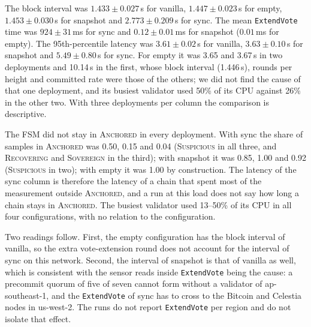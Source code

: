 The block interval was $1.433 \pm 0.027$\,s for vanilla, $1.447 \pm 0.023$\,s for empty, $1.453 \pm 0.030$\,s for snapshot and $2.773 \pm 0.209$\,s for sync. The mean \texttt{ExtendVote} time was $924 \pm 31$\,ms for sync and $0.12 \pm 0.01$\,ms for snapshot ($0.01$\,ms for empty). The 95th-percentile latency was $3.61 \pm 0.02$\,s for vanilla, $3.63 \pm 0.10$\,s for snapshot and $5.49 \pm 0.80$\,s for sync. For empty it was 3.65 and 3.67\,s in two deployments and 10.14\,s in the first, whose block interval (1.446\,s), rounds per height and committed rate were those of the others; we did not find the cause of that one deployment, and its busiest validator used 50\% of its CPU against 26\% in the other two. With three deployments per column the comparison is descriptive.

The FSM did not stay in \textsc{Anchored} in every deployment. With sync the share of samples in \textsc{Anchored} was 0.50, 0.15 and 0.04 (\textsc{Suspicious} in all three, and \textsc{Recovering} and \textsc{Sovereign} in the third); with snapshot it was 0.85, 1.00 and 0.92 (\textsc{Suspicious} in two); with empty it was 1.00 by construction. The latency of the sync column is therefore the latency of a chain that spent most of the measurement outside \textsc{Anchored}, and a run at this load does not say how long a chain stays in \textsc{Anchored}. The busiest validator used 13--50\% of its CPU in all four configurations, with no relation to the configuration.

Two readings follow. First, the empty configuration has the block interval of vanilla, so the extra vote-extension round does not account for the interval of sync on this network. Second, the interval of snapshot is that of vanilla as well, which is consistent with the sensor reads inside \texttt{ExtendVote} being the cause: a precommit quorum of five of seven cannot form without a validator of ap-southeast-1, and the \texttt{ExtendVote} of sync has to cross to the Bitcoin and Celestia nodes in us-west-2. The runs do not report \texttt{ExtendVote} per region and do not isolate that effect.

